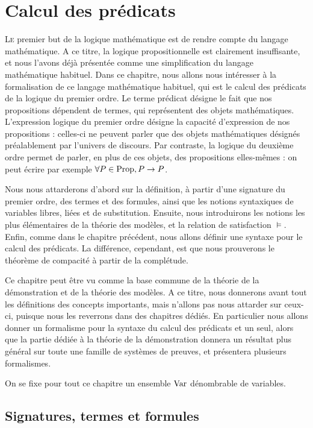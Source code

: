 \chapter{Calcul des prédicats}
\label{chp.logpred}

\minitoc

\lettrine{L}{e} premier but de la logique mathématique est de rendre compte du
langage mathématique. A ce titre, la logique propositionnelle est clairement
insuffisante, et nous l'avons déjà présentée comme une simplification du langage
mathématique habituel. Dans ce chapitre, nous allons nous intéresser à la
formalisation de ce langage mathématique habituel, qui est le calcul des
prédicats de la logique du premier ordre. Le terme prédicat désigne le fait que
nos propositions dépendent de termes, qui représentent des objets mathématiques.
L'expression \og logique du premier ordre\fg{} désigne la capacité d'expression
de nos propositions : celles-ci ne peuvent parler que des objets mathématiques
désignés préalablement par l'univers de discours. Par contraste, la logique du
deuxième ordre permet de parler, en plus de ces objets, des propositions
elles-mêmes : on peut écrire par exemple $\forall P\in\operatorname{Prop}, P\to P$.

Nous nous attarderons d'abord sur la définition, à partir d'une signature du
premier ordre, des termes et des formules, ainsi que les notions syntaxiques de
variables libres, liées et de substitution. Ensuite, nous introduirons les
notions les plus élémentaires de la théorie des modèles, et la relation de
satisfaction $\models$. Enfin, comme dans le chapitre précédent, nous allons
définir une syntaxe pour le calcul des prédicats. La différence, cependant,
est que nous prouverons le théorème de compacité à partir de la complétude.

Ce chapitre peut être vu comme la base commune de la théorie de la démonstration
et de la théorie des modèles. A ce titre, nous donnerons avant tout les
définitions des concepts importants, mais n'allons pas nous attarder sur ceux-ci,
puisque nous les reverrons dans des chapitres dédiés. En particulier nous allons
donner un formalisme pour la syntaxe du calcul des prédicats et un seul, alors
que la partie dédiée à la théorie de la démonstration donnera un résultat plus
général sur toute une famille de systèmes de preuves, et présentera plusieurs
formalismes.

On se fixe pour tout ce chapitre un ensemble $\operatorname{Var}$ dénombrable de variables.

\section{Signatures, termes et formules}

